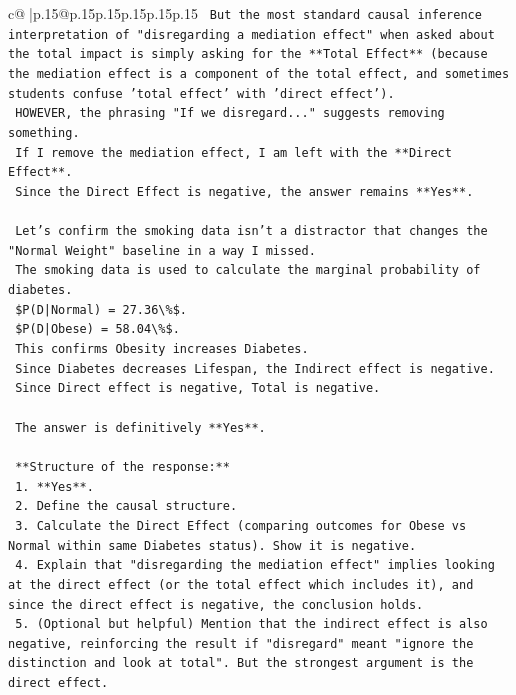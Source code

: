 \documentclass{article}
\begin{document}
{\begin{supertabular}{c@{$\;$}|p{.15\linewidth}@{}p{.15\linewidth}p{.15\linewidth}p{.15\linewidth}p{.15\linewidth}p{.15\linewidth}}
{{{\texttt{    But the most standard causal inference interpretation of "disregarding a mediation effect" when asked about the total impact is simply asking for the **Total Effect** (because the mediation effect is a component of the total effect, and sometimes students confuse 'total effect' with 'direct effect').} \\
\texttt{    HOWEVER, the phrasing "If we disregard..." suggests removing something.} \\
\texttt{    If I remove the mediation effect, I am left with the **Direct Effect**.} \\
\texttt{    Since the Direct Effect is negative, the answer remains **Yes**.} \\
\\ 
\texttt{    Let's confirm the smoking data isn't a distractor that changes the "Normal Weight" baseline in a way I missed.} \\
\texttt{    The smoking data is used to calculate the marginal probability of diabetes.} \\
\texttt{    \$P(D|Normal) = 27.36\textbackslash{}\%\$.} \\
\texttt{    \$P(D|Obese) = 58.04\textbackslash{}\%\$.} \\
\texttt{    This confirms Obesity increases Diabetes.} \\
\texttt{    Since Diabetes decreases Lifespan, the Indirect effect is negative.} \\
\texttt{    Since Direct effect is negative, Total is negative.} \\
\\ 
\texttt{    The answer is definitively **Yes**.} \\
\\ 
\texttt{    **Structure of the response:**} \\
\texttt{    1.  **Yes**.} \\
\texttt{    2.  Define the causal structure.} \\
\texttt{    3.  Calculate the Direct Effect (comparing outcomes for Obese vs Normal within same Diabetes status). Show it is negative.} \\
\texttt{    4.  Explain that "disregarding the mediation effect" implies looking at the direct effect (or the total effect which includes it), and since the direct effect is negative, the conclusion holds.} \\
\texttt{    5.  (Optional but helpful) Mention that the indirect effect is also negative, reinforcing the result if "disregard" meant "ignore the distinction and look at total". But the strongest argument is the direct effect.} \\
}}}
\end{supertabular}}
\end{document}
